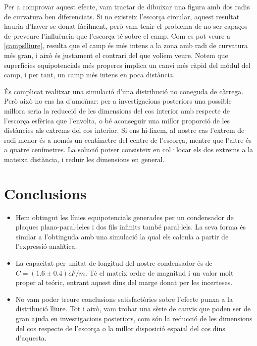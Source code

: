 Per a comprovar aquest efecte, vam tractar de dibuixar una figura amb dos radis de curvatura ben diferenciats. Si no existeix l'escorça circular, aquest resultat hauria d'haver-se donat fàcilment, però vam tenir el problema de no ser capaços de preveure l'influència que l'escorça té sobre el camp. Com es pot veure a \ref{campslliure}, resulta que el camp és més intens a la zona amb radi de curvatura més gran, i això és justament el contrari del que volíem veure. Notem que superfícies equipotencials més properes implica un canvi més ràpid del módul del camp, i per tant, un camp més intens en poca distància.

És complicat realitzar una simulació d'una distribució no coneguda de càrrega. Però això no ens ha d'amoïnar: per a investigacions posteriors una possible millora seria la reducció de les dimensions del cos interior amb respecte de l'escorça esfèrica que l'envolta, o bé aconseguir una millor proporció de les distàncies als extrems del cos interior. Si ens hi-fixem, al nostre cas l'extrem de radi menor és a només un centímetre del centre de l'escorça, mentre que l'altre és a quatre cenímetres. La solució potser consisteix en col·locar els dos extrems a la mateixa distància, i reduir les dimensions en general.
\section{Conclusions}
\begin{itemize}
\item Hem obtingut les línies equipotencials generades per un condensador de plaques plano-paral$\cdot$leles i dos fils infinits també paral$\cdot$lels. La seva forma és similar a l'obtinguda amb una simulació la qual els calcula a partir de l'expressió analítica.
\item La capacitat per unitat de longitud del nostre condensador és de $C=(1.6\pm0.4)\epsilon F/m$. Té el mateix ordre de magnitud i un valor molt proper al teóric, entrant aquest dins del marge donat per les incerteses.
\item No vam poder treure conclusions satisfactòries sobre l'efecte punxa a la distribució lliure. Tot i això, vam trobar una sèrie de canvis que poden ser de gran ajuda en investigacions posteriors, com són la reducció de les dimensions del cos respecte de l'escorça o la millor disposició espaial del cos dins d'aquesta.
\end{itemize}
